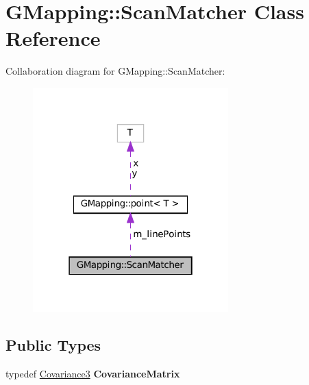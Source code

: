 \hypertarget{classGMapping_1_1ScanMatcher}{}\section{G\+Mapping\+:\+:Scan\+Matcher Class Reference}
\label{classGMapping_1_1ScanMatcher}


Collaboration diagram for G\+Mapping\+:\+:Scan\+Matcher\+:
\nopagebreak
\begin{figure}[H]
\begin{center}
\leavevmode
\includegraphics[width=214pt]{classGMapping_1_1ScanMatcher__coll__graph}
\end{center}
\end{figure}
\subsection*{Public Types}
\begin{DoxyCompactItemize}
\item 
\mbox{\label{classGMapping_1_1ScanMatcher_aa8ccaea5e1c6949e7913e487f35b8c46}} 
typedef \hyperlink{structGMapping_1_1Covariance3}{Covariance3} {\bfseries Covariance\+Matrix}
\end{DoxyCompactItemize}
